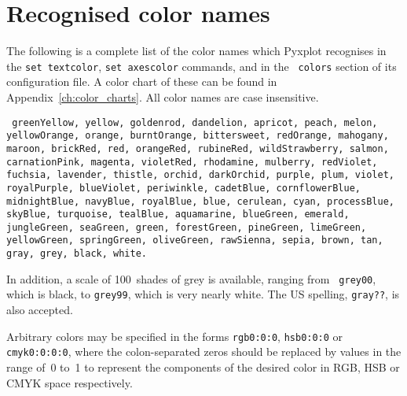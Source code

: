 \section{Recognised color names}
\label{sec:color_names}

The following is a complete list of the color names which Pyxplot recognises
in the {\tt set textcolor}, {\tt set axescolor} commands, and in the {\tt
colors} section of its configuration file.  A color chart of these can be
found in Appendix~\ref{ch:color_charts}.  All color names are case
insensitive.

\vspace{5mm}\noindent
{}
{\tt
greenYellow, yellow, goldenrod, dandelion, apricot, peach, melon,\newline\noindent
yellowOrange, orange, burntOrange, bittersweet, redOrange,\newline\noindent
mahogany, maroon, brickRed, red, orangeRed, rubineRed,\newline\noindent
wildStrawberry, salmon, carnationPink, magenta, violetRed,\newline\noindent
rhodamine, mulberry, redViolet, fuchsia, lavender, thistle,\newline\noindent
orchid, darkOrchid, purple, plum, violet, royalPurple,\newline\noindent
blueViolet, periwinkle, cadetBlue, cornflowerBlue, midnightBlue,\newline\noindent
navyBlue, royalBlue, blue, cerulean, cyan, processBlue, skyBlue,\newline\noindent
turquoise, tealBlue, aquamarine, blueGreen, emerald, jungleGreen,\newline\noindent
seaGreen, green, forestGreen, pineGreen, limeGreen, yellowGreen,\newline\noindent
springGreen, oliveGreen, rawSienna, sepia, brown, tan, gray,\newline\noindent
grey, black, white.
}

\vspace{5mm}
In addition, a scale of 100~shades of grey is available, ranging from {\tt
grey00}, which is black, to {\tt grey99}, which is very nearly white.  The US
spelling, {\tt gray??}, is also accepted.

Arbitrary colors may be specified in the forms {\tt rgb0:0:0}, {\tt hsb0:0:0}
or {\tt cmyk0:0:0:0}, where the colon-separated zeros should be replaced by
values in the range of~0 to~1 to represent the components of the desired color
in RGB, HSB or CMYK space
respectively.

